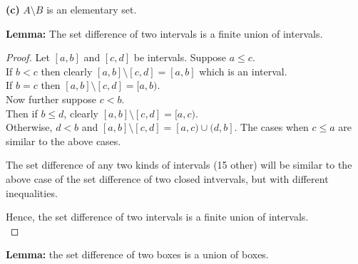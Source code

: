 \documentclass[12pt]{article}
\begin{document}
	\hspace{-4 ex}\textbf{(c)} $A \setminus B$ is an elementary set. \bigbreak
	
	\textbf{Lemma:} The set difference of two intervals is a finite union of intervals.
	
	\begin{proof}
		Let $[a,b]$ and $[c,d]$ be intervals. \bigbreak
		Suppose $a \leq c$. \\
		If $ b < c$ then clearly $[a,b] \setminus [c,d] = [a,b]$ which is an interval. \\
		If $b=c$ then $[a,b] \setminus [c,d] = [a,b)$. \\
		Now further suppose $ c < b$. \\
		Then if $b \leq d$, clearly $[a,b] \setminus [c,d] = [a,c)$. \\
		Otherwise, $ d < b$ and $[a,b] \setminus [c,d] = [a,c) \cup (d,b]$. \bigbreak
		The cases when $c \leq a$ are similar to the above cases. \bigbreak
		
		The set difference of any two kinds of intervals (15 other) will be similar to the above case of the set difference of two closed intvervals, but with different inequalities. \bigbreak
		
		Hence, the set difference of two intervals is a finite union of intervals. \\
	\end{proof}

\textbf{Lemma:} the set difference of two boxes is a union of boxes.
\end{document}
